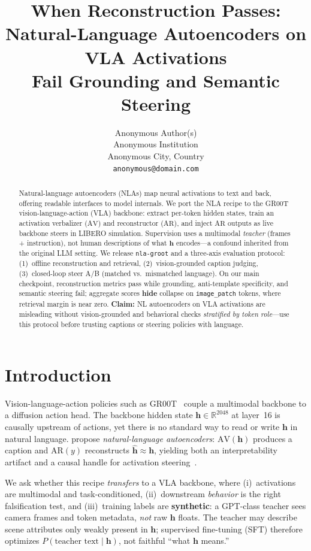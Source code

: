 \documentclass{article}
\title{When Reconstruction Passes:\\
  Natural-Language Autoencoders on VLA Activations\\
  Fail Grounding and Semantic Steering}
\author{
  Anonymous Author(s)\\
  Anonymous Institution\\
  Anonymous City, Country\\
  \texttt{anonymous@domain.com}
}
\newcommand{\AV}{\ensuremath{\mathrm{AV}}}
\newcommand{\AR}{\ensuremath{\mathrm{AR}}}
\newcommand{\hvec}{\mathbf{h}}
\newcommand{\hhat}{\hat{\mathbf{h}}}
\newcommand{\code}[1]{\texttt{\small #1}}
\begin{document}
\maketitle

\begin{abstract}
Natural-language autoencoders (NLAs) map neural activations to text and back,
offering readable interfaces to model internals.
We port the NLA recipe to the GR00T vision-language-action (VLA) backbone:
extract per-token hidden states, train an activation verbalizer (\AV) and
reconstructor (\AR), and inject \AR{} outputs as live backbone steers in
LIBERO simulation.
Supervision uses a multimodal \emph{teacher} (frames + instruction), not
human descriptions of what \(\hvec\) encodes---a confound inherited from the
original LLM setting.
We release \code{nla-groot} and a three-axis evaluation protocol:
(1)~offline reconstruction and retrieval,
(2)~vision-grounded caption judging,
(3)~closed-loop steer A/B (matched vs.\ mismatched language).
On our main checkpoint, reconstruction metrics pass while grounding,
anti-template specificity, and semantic steering fail; aggregate scores
\textbf{hide} collapse on \code{image\_patch} tokens, where retrieval
margin is near zero.
\textbf{Claim:} NL autoencoders on VLA activations are misleading without
vision-grounded and behavioral checks \emph{stratified by token role}---use
this protocol before trusting captions or steering policies with language.
\end{abstract}


\section{Introduction}
\label{sec:intro}

Vision-language-action policies such as GR00T~\citep{nvidia2025gr00t} couple a
multimodal backbone to a diffusion action head.
The backbone hidden state \(\hvec \in \mathbb{R}^{2048}\) at layer~16 is
causally upstream of actions, yet there is no standard way to read or write
\(\hvec\) in natural language.
\citet{frasertaliente2026nla} propose \emph{natural-language autoencoders}:
\(\AV(\hvec)\) produces a caption and \(\AR(y)\) reconstructs
\(\hhat \approx \hvec\), yielding both an interpretability artifact and a
causal handle for activation steering~\citep{turner2023actadd,zou2023repe}.

We ask whether this recipe \emph{transfers} to a VLA backbone, where
(i)~activations are multimodal and task-conditioned,
(ii)~downstream \emph{behavior} is the right falsification test, and
(iii)~training labels are \textbf{synthetic}: a GPT-class teacher sees camera
frames and token metadata, \emph{not} raw \(\hvec\) floats.
The teacher may describe scene attributes only weakly present in \(\hvec\);
supervised fine-tuning (SFT) therefore optimizes
\(P(\text{teacher text} \mid \hvec)\), not faithful ``what \(\hvec\) means.''
\end{document}
